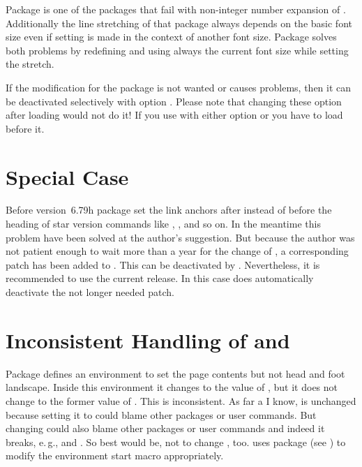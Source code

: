 Package  is one of the
packages that fail with non-integer number expansion of
. Additionally the line stretching of that package always
depends on the basic font size even if setting is made in the context of
another font size. Package  solves both problems by
redefining  and  using always the
current font size while setting the stretch.

If the modification for the package is not wanted or causes problems,
then it can be deactivated selectively with option
.
Please note that changing these option after loading
 would not do it! If you use  with
either option  or  you have to
load  before it.


\section{Special Case }

Before version~6.79h package  set the link anchors after
instead of before the heading of star version commands like ,
, and so on. In the meantime this problem have been solved at
the \KOMAScript{} author's suggestion. But because the \KOMAScript{} author
was not patient enough to wait more than a year for the change of
, a corresponding patch has been added to
. This can be deactivated by
. Nevertheless, it is recommended to use the
current  release. In this case  does
automatically deactivate the not longer needed patch.%


\section{Inconsistent Handling of  and }

Package  defines an
environment  to set the page
contents but not head and foot landscape. Inside this environment it changes
 to the value of
, but it does not change  to the former
value of .  This is inconsistent. As far a I know,
 is unchanged because setting it to 
could blame other packages or user commands. But changing 
could also blame other packages or user commands and indeed it breaks, e.\,g.,
 and
. So best would be, not to change
, too.  uses package  (see
\cite{package:xpatch}) to modify the environment start macro 
appropriately.

